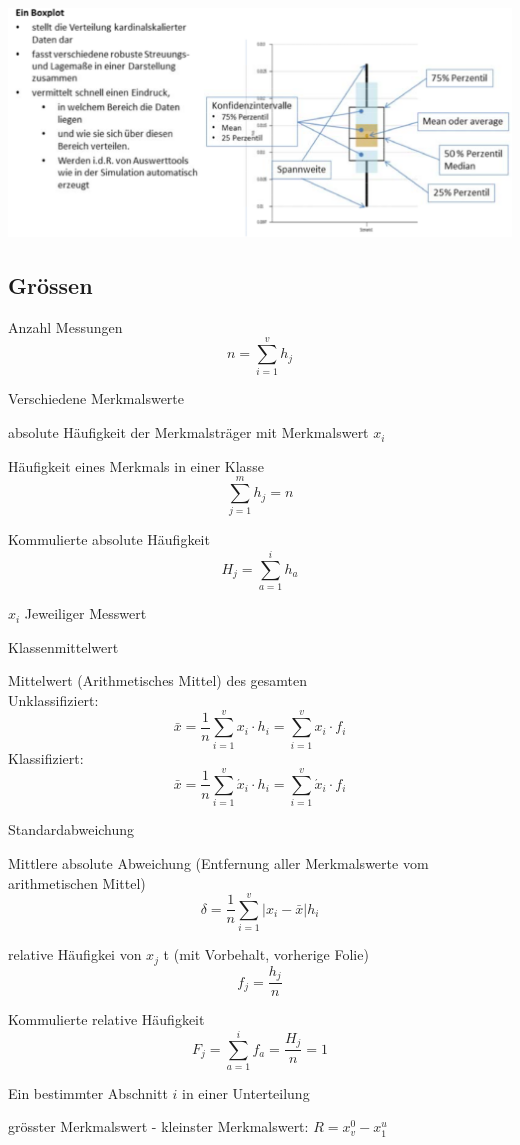 \includegraphics[scale=0.5]{img/boxplot.png}


\subsection{Grössen}

\begin{description}
	\item[$n$]		Anzahl Messungen
	\[
		n = \sum^v_{i=1}{h_j}
	\]
	\item[$v$]		Verschiedene Merkmalswerte
	\item[$h_j$] absolute Häufigkeit der Merkmalsträger mit Merkmalswert $x_i$
	\item[$h_i$] Häufigkeit eines Merkmals in einer Klasse
	\hfill \\
		\[
			\sum^{m}_{j=1}{h_j} = n
		\]
	\item[$H_j$]		Kommulierte absolute Häufigkeit
		\[
			H_j = \sum^i_{a=1}{h_a}
		\]
	\item{$x_i$}		Jeweiliger Messwert
	\item[$\acute{x}_j$] Klassenmittelwert
	\item[$\bar{x}$]	Mittelwert (Arithmetisches Mittel) des gesamten \hfill \\
		Unklassifiziert:
		\[
			\bar{x} = \frac1n \sum^v_{i=1}{x_i \cdot h_i} = \sum^v_{i=1}{x_i \cdot f_i}
		\]
		Klassifiziert:
		\[
		\bar{x} = \frac1n \sum^v_{i=1}{\acute{x}_i \cdot h_i} = \sum^v_{i=1}{\acute{x}_i \cdot f_i}
		\]
		
	\item[$\sigma$]		Standardabweichung
	\item[$\delta$]		Mittlere absolute Abweichung (Entfernung aller Merkmalswerte vom arithmetischen Mittel)
		\[
			\delta = \frac1n \sum^v_{i=1}{\left|x_i - \bar{x}\right|h_i}
		\]
	\item[$f_j$]		relative Häufigkei von $x_j$ t (mit Vorbehalt, vorherige Folie) \hfill \\
		\[
			f_j = \frac{h_j}n
		\]
	\item[$F_j$]		Kommulierte relative Häufigkeit
		\[
			F_j = \sum^i_{a=1}{f_a} = \frac{H_j}n = 1
		\]
	\item[$Q_i$]		Ein bestimmter Abschnitt $i$ in einer Unterteilung
	\item[$R$]			grösster Merkmalswert - kleinster Merkmalswert: $R = x_v^0 - x_1^u$
\end{description}


